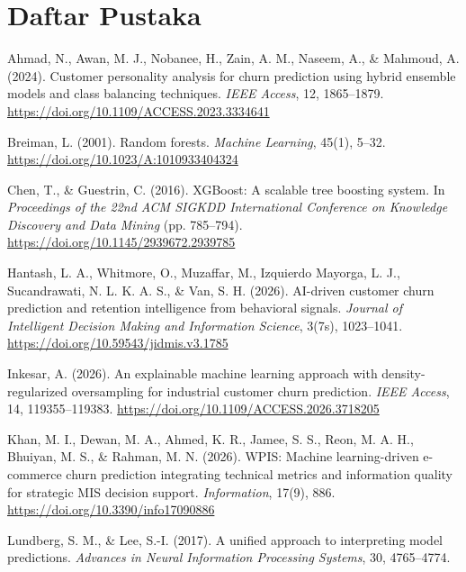 \documentclass[11pt,a4paper]{article}
\begin{document}
\section*{Daftar Pustaka}

\begingroup
\fontsize{10}{14.5}\selectfont
\setlength{\parindent}{0pt}
\setlength{\parskip}{5pt}
\newcommand{\bibentry}[1]{\par\hangindent=1.0cm #1\par}

\bibentry{Ahmad, N., Awan, M. J., Nobanee, H., Zain, A. M., Naseem, A., \& Mahmoud, A. (2024). Customer personality analysis for churn prediction using hybrid ensemble models and class balancing techniques. \textit{IEEE Access}, 12, 1865--1879. \url{https://doi.org/10.1109/ACCESS.2023.3334641}}

\bibentry{Breiman, L. (2001). Random forests. \textit{Machine Learning}, 45(1), 5--32. \url{https://doi.org/10.1023/A:1010933404324}}

\bibentry{Chen, T., \& Guestrin, C. (2016). XGBoost: A scalable tree boosting system. In \textit{Proceedings of the 22nd ACM SIGKDD International Conference on Knowledge Discovery and Data Mining} (pp. 785--794). \url{https://doi.org/10.1145/2939672.2939785}}

\bibentry{Hantash, L. A., Whitmore, O., Muzaffar, M., Izquierdo Mayorga, L. J., Sucandrawati, N. L. K. A. S., \& Van, S. H. (2026). AI-driven customer churn prediction and retention intelligence from behavioral signals. \textit{Journal of Intelligent Decision Making and Information Science}, 3(7s), 1023--1041. \url{https://doi.org/10.59543/jidmis.v3.1785}}

\bibentry{Inkesar, A. (2026). An explainable machine learning approach with density-regularized oversampling for industrial customer churn prediction. \textit{IEEE Access}, 14, 119355--119383. \url{https://doi.org/10.1109/ACCESS.2026.3718205}}

\bibentry{Khan, M. I., Dewan, M. A., Ahmed, K. R., Jamee, S. S., Reon, M. A. H., Bhuiyan, M. S., \& Rahman, M. N. (2026). WPIS: Machine learning-driven e-commerce churn prediction integrating technical metrics and information quality for strategic MIS decision support. \textit{Information}, 17(9), 886. \url{https://doi.org/10.3390/info17090886}}

\bibentry{Lundberg, S. M., \& Lee, S.-I. (2017). A unified approach to interpreting model predictions. \textit{Advances in Neural Information Processing Systems}, 30, 4765--4774.}
\endgroup
\end{document}

